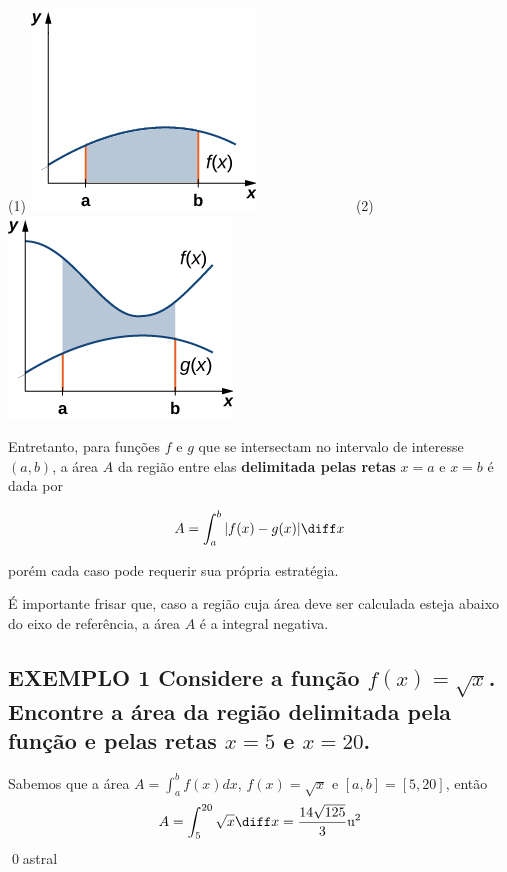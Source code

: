 \documentclass[a4paper, 12pt]{extreport}
\begin{document}
    \begin{center}
      {
        (1)
        \includegraphics{fx}
      }
      \ \ \ \ \ \ \ \ \ \ \ \ \
      {
        (2)
        \includegraphics{two-func}
      }
    \end{center}

    Entretanto, para funções $ f $ e $ g $ que se intersectam no intervalo de interesse $ (a, b) $, a área $A$ da região entre elas \textbf{delimitada pelas
    retas} $x=a$ e $x=b$ é dada por

    \begin{equation} \label{eq:3}
      A = \int_a^b{|f(x) - g(x)|}\diff x
    \end{equation}

    \flushleft porém cada caso pode requerir sua própria estratégia.

    {\justifying É importante frisar que, caso a região cuja área deve ser calculada esteja abaixo do eixo de referência,
    a área $A$ é a integral negativa.}

    \subsection*{\small {\color{astral}EXEMPLO 1} \textmd{
      Considere a função $f(x) = \sqrt{x}$. Encontre a área da região delimitada pela função e pelas retas $x=5$ e $x=20$.
    }}
      Sabemos que a área $A=\int_a^b{f(x)dx}$, $f(x)=\sqrt{x}$ e $[a, b]=[5, 20]$, então
      $$ A = \int_5^{20}{\sqrt{x}\diff x} = \frac{14\sqrt{125}}{3}\mathrm{u^2} $$
      \qed{astral}
\end{document}
